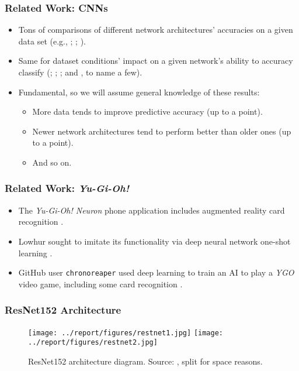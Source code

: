 \documentclass[11pt]{beamer}
\begin{document}
\begin{frame}
	\frametitle{Related Work: CNNs}
\pause
	\begin{itemize}
	\item Tons of comparisons of different network architectures' accuracies on a given data set (e.g., \cite{mods1}; \cite{mods2}; \cite{mods3}).
\pause
	\item Same for dataset conditions' impact on a given network's ability to accuracy classify (\cite{ds1}; \cite{ds2}; \cite{ds3}; and \cite{smallds}, to name a few).
\pause
	\item Fundamental, so we will assume general knowledge of these results:
\pause
		\begin{itemize}
		\item More data tends to improve predictive accuracy (up to a point).
\pause
		\item Newer network architectures tend to perform better than older ones (up to a point).
\pause
		\item And so on.
		\end{itemize}
	\end{itemize}
\end{frame}

\begin{frame}
	\frametitle{Related Work: \textit{Yu-Gi-Oh!}}

	\begin{itemize}
	\item The \textit{Yu-Gi-Oh! Neuron} phone application includes augmented reality card recognition \cite{kon}.
	\item Lowhur sought to imitate its functionality via deep neural network one-shot learning \cite{dl}.
	\item GitHub user \texttt{chronoreaper} used deep learning to train an AI to play a \textit{YGO} video game, including some card recognition \cite{ai}.
	\end{itemize}
\end{frame}

%
%

\begin{frame}
	\frametitle{ResNet152 Architecture}
	
	\begin{figure}[h]
	\begin{center}
	\vspace*{-1cm}
	\texttt{[image: ../report/figures/restnet1.jpg]}
	\hspace{1cm}
	\texttt{[image: ../report/figures/restnet2.jpg]}
	\caption[caption]{ResNet152 architecture diagram. Source: \cite{resnet}, split for space reasons.}
	\label{fig:resnet}
	\end{center}
	\end{figure}
\end{frame}
\end{document}
